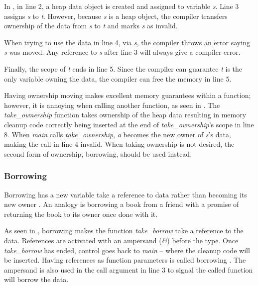 
In , in line 2, a heap data object is created and assigned to variable \textit{s}.
Line 3 assigns \textit{s} to \textit{t}.
However, because \textit{s} is a heap object, the compiler transfers ownership of the data from \textit{s} to \textit{t} and marks \textit{s} as invalid.

When trying to use the data in line 4, via \textit{s}, the compiler throws an error saying \textit{s} was moved.
Any reference to \textit{s} after line 3 will always give a compiler error.

Finally, the scope of \textit{t} ends in line 5.
Since the compiler can guarantee \textit{t} is the only variable owning the data, the compiler can free the memory in line 5.


Having ownership moving makes excellent memory guarantees within a function; however, it is annoying when calling another function, as seen in .
The \textit{take\_ownership} function takes ownership of the heap data resulting in memory cleanup code correctly being inserted at the end of \textit{take\_ownership}'s scope in line 8.
When \textit{main} calls \textit{take\_ownership}, \textit{a} becomes the new owner of \textit{s}'s data, making the call in line 4 invalid.
When taking ownership is not desired, the second form of ownership, borrowing, should be used instead.

\subsubsection{Borrowing}

Borrowing has a new variable take a reference to data rather than becoming its new owner \cite{klabnik_2019_01}.
An analogy is borrowing a book from a friend with a promise of returning the book to its owner once done with it.


As seen in , borrowing makes the function \textit{take\_borrow} take a reference to the data.
References are activated with an ampersand (\textit{\&}) before the type.
Once \textit{take\_borrow} has ended, control goes back to \textit{main} -- where the cleanup code will be inserted.
Having references as function parameters is called borrowing \cite{klabnik_2019_01}.
The ampersand is also used in the call argument in line 3 to signal the called function will borrow the data.

